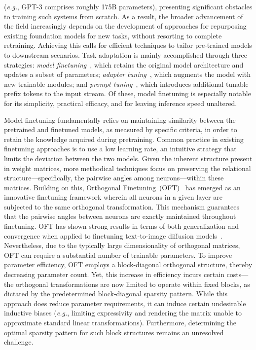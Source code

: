 (\emph{e.g.}, GPT-3 comprises roughly 175B parameters), presenting significant obstacles to training such systems from scratch. As a result, the broader advancement of the field increasingly depends on the development of approaches for repurposing existing foundation models for new tasks, without resorting to complete retraining. Achieving this calls for efficient techniques to tailor pre-trained models to downstream scenarios. Task adaptation is mainly accomplished through three strategies: \emph{model finetuning}~\cite{hulora2022,zaken2022bitfit,guo2020parameter,raffel2020exploring,qiu2023controlling,zhang2022adaptive,chavan2023one}, which retains the original model architecture and updates a subset of parameters; \emph{adapter tuning}~\cite{rebuffi2017learning,houlsby2019parameter,pfeiffer2020adapterfusion,lin2020exploring,he2021towards}, which augments the model with new trainable modules; and \emph{prompt tuning}~\cite{li2021prefix,lester2021power}, which introduces additional tunable prefix tokens to the input stream. Of these, model finetuning is especially notable for its simplicity, practical efficacy, and for leaving inference speed unaltered.

Model finetuning fundamentally relies on maintaining similarity between the pretrained and finetuned models, as measured by specific criteria, in order to retain the knowledge acquired during pretraining. Common practice in existing finetuning approaches is to use a low learning rate, an intuitive strategy that limits the deviation between the two models. Given the inherent structure present in weight matrices, more methodical techniques focus on preserving the relational structure—specifically, the pairwise angles among neurons—within these matrices. Building on this, Orthogonal Finetuning~(OFT)~\cite{qiu2023controlling} has emerged as an innovative finetuning framework wherein all neurons in a given layer are subjected to the same orthogonal transformation. This mechanism guarantees that the pairwise angles between neurons are exactly maintained throughout finetuning. OFT has shown strong results in terms of both generalization and convergence when applied to finetuning text-to-image diffusion models~\cite{qiu2023controlling}. Nevertheless, due to the typically large dimensionality of orthogonal matrices, OFT can require a substantial number of trainable parameters. To improve parameter efficiency, OFT employs a block-diagonal orthogonal structure, thereby decreasing parameter count. Yet, this increase in efficiency incurs certain costs—the orthogonal transformations are now limited to operate within fixed blocks, as dictated by the predetermined block-diagonal sparsity pattern. While this approach does reduce parameter requirements, it can induce certain undesirable inductive biases (\emph{e.g.}, limiting expressivity and rendering the matrix unable to approximate standard linear transformations). Furthermore, determining the optimal sparsity pattern for such block structures remains an unresolved challenge.

